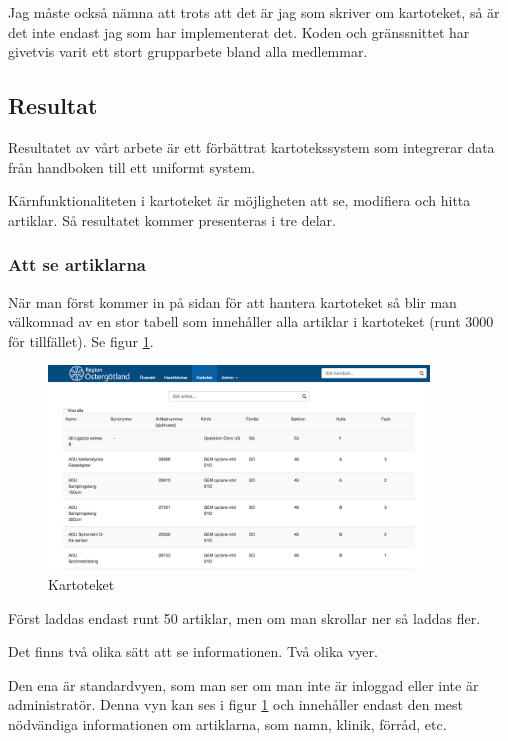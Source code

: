 Jag måste också nämna att trots att det är jag som skriver om kartoteket,
så är det inte endast jag som har implementerat det. Koden och gränssnittet har givetvis
varit ett stort grupparbete bland alla medlemmar.


\clearpage
\subsection{Resultat}
Resultatet av vårt arbete är ett förbättrat kartotekssystem
som integrerar data från handboken till ett uniformt system.

Kärnfunktionaliteten i kartoteket är möjligheten att se, modifiera och hitta artiklar.
Så resultatet kommer presenteras i tre delar.

\subsubsection{Att se artiklarna}
När man först kommer in på sidan för att hantera kartoteket så
blir man välkomnad av en stor tabell som innehåller alla artiklar
i kartoteket (runt 3000 för tillfället). Se figur \ref{fig:table}.

\begin{figure}[h!]
  \centering
  \includegraphics[width=0.9\textwidth]{../images/kartotek1.png}
  \caption{Kartoteket}
  \label{fig:table}
\end{figure}

Först laddas endast runt 50 artiklar, men
om man skrollar ner så laddas fler.

Det finns två olika sätt att se informationen.
Två olika vyer.

Den ena är standardvyen, som man ser om man inte är inloggad
eller inte är administratör. Denna vyn kan ses i figur \ref{fig:table}
och innehåller endast den mest nödvändiga informationen om
artiklarna, som namn, klinik, förråd, etc.

